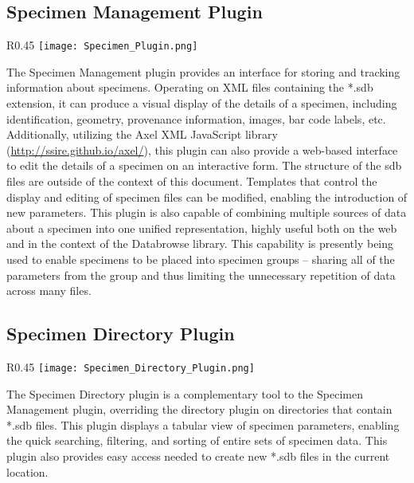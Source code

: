 \documentclass[10pt]{article}
\begin{document}
\endgroup


\clearpage
\begingroup
\setlength\intextsep{0pt}
\subsection{Specimen Management Plugin}
\begin{wrapfigure}[20]{R}{0.45\textwidth}
		\texttt{[image: Specimen\_Plugin.png]}
\end{wrapfigure}
The Specimen Management plugin provides an interface for storing and tracking information about specimens.  Operating on XML files containing the *.sdb extension, it can produce a visual display of the details of a specimen, including identification, geometry, provenance information, images, bar code labels, etc.  Additionally, utilizing the Axel XML JavaScript library (\url{http://ssire.github.io/axel/}), this plugin can also provide a web-based interface to edit the details of a specimen on an interactive form.  The structure of the sdb files are outside of the context of this document.  Templates that control the display and editing of specimen files can be modified, enabling the introduction of new parameters.  This plugin is also capable of combining multiple sources of data about a specimen into one unified representation, highly useful both on the web and in the context of the Databrowse library.  This capability is presently being used to enable specimens to be placed into specimen groups -- sharing all of the parameters from the group and thus limiting the unnecessary repetition of data across many files.

\endgroup



\begingroup
\setlength\intextsep{0pt}
\subsection{Specimen Directory Plugin}
\begin{wrapfigure}[20]{R}{0.45\textwidth}
		\texttt{[image: Specimen\_Directory\_Plugin.png]}
\end{wrapfigure}
The Specimen Directory plugin is a complementary tool to the Specimen Management plugin, overriding the directory plugin on directories that contain *.sdb files.  This plugin displays a tabular view of specimen parameters, enabling the quick searching, filtering, and sorting of entire sets of specimen data.  This plugin also provides easy access needed to create new *.sdb files in the current location.
\end{document}
